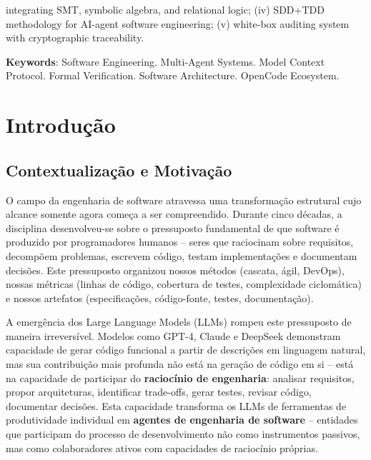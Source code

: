\documentclass[12pt,a4paper,sumario=tradicional,openany]{abntex2}
\begin{document}
integrating SMT, symbolic algebra, and relational logic; (iv) SDD+TDD methodology for AI-agent software engineering; (v) white-box auditing system with cryptographic traceability.

\vspace{0.5cm}
\textbf{Keywords}: Software Engineering. Multi-Agent Systems. Model Context Protocol. Formal Verification. Software Architecture. OpenCode Ecosystem.

\newpage
\listoffigures
\vspace{1cm}
\listoftables
\newpage
\tableofcontents
\newpage

\chapter{Introdução}

\section{Contextualização e Motivação}

O campo da engenharia de software atravessa uma transformação estrutural cujo alcance somente agora começa a ser compreendido. Durante cinco décadas, a disciplina desenvolveu-se sobre o pressuposto fundamental de que software é produzido por programadores humanos -- seres que raciocinam sobre requisitos, decompõem problemas, escrevem código, testam implementações e documentam decisões. Este pressuposto organizou nossos métodos (cascata, ágil, DevOps), nossas métricas (linhas de código, cobertura de testes, complexidade ciclomática) e nossos artefatos (especificações, código-fonte, testes, documentação).

A emergência dos Large Language Models (LLMs) rompeu este pressuposto de maneira irreversível. Modelos como GPT-4, Claude e DeepSeek demonstram capacidade de gerar código funcional a partir de descrições em linguagem natural, mas sua contribuição mais profunda não está na geração de código em si -- está na capacidade de participar do \textbf{raciocínio de engenharia}: analisar requisitos, propor arquiteturas, identificar trade-offs, gerar testes, revisar código, documentar decisões. Esta capacidade transforma os LLMs de ferramentas de produtividade individual em \textbf{agentes de engenharia de software} -- entidades que participam do processo de desenvolvimento não como instrumentos passivos, mas como colaboradores ativos com capacidades de raciocínio próprias.
\end{document}
